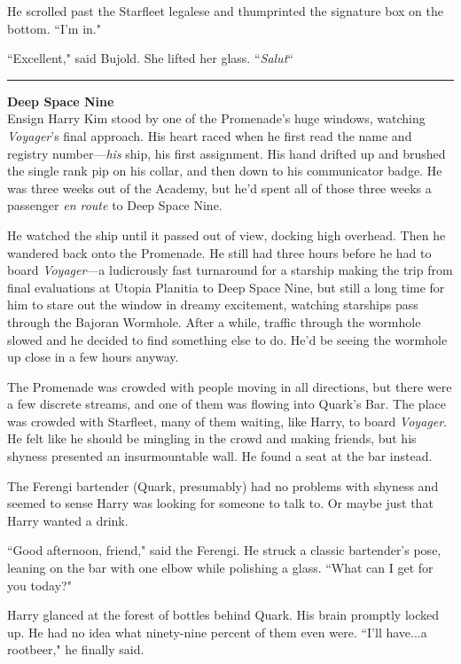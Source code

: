 \documentclass[twoside,letterpaper,12pt]{memoir}
\begin{document}
He scrolled past the Starfleet legalese and thumprinted the signature box on the bottom. ``I'm in."

``Excellent," said Bujold. She lifted her glass. ``\textit{Salut}``

\begin{center}\rule{3cm}{0.4 pt}\end{center}

\noindent\textbf{Deep Space Nine}\\

Ensign Harry Kim stood by one of the Promenade's huge windows, watching \textit{Voyager}'s final approach. His heart raced when he first read the name and registry number---\textit{his} ship, his first assignment. His hand drifted up and brushed the single rank pip on his collar, and then down to his communicator badge. He was three weeks out of the Academy, but he'd spent all of those three weeks a passenger \textit{en route} to Deep Space Nine.

He watched the ship until it passed out of view, docking high overhead. Then he wandered back onto the Promenade. He still had three hours before he had to board \textit{Voyager}---a ludicrously fast turnaround for a starship making the trip from final evaluations at Utopia Planitia to Deep Space Nine, but still a long time for him to stare out the window in dreamy excitement, watching starships pass through the Bajoran Wormhole. After a while, traffic through the wormhole slowed and he decided to find something else to do. He'd be seeing the wormhole up close in a few hours anyway.

The Promenade was crowded with people moving in all directions, but there were a few discrete streams, and one of them was flowing into Quark's Bar. The place was crowded with Starfleet, many of them waiting, like Harry, to board \textit{Voyager}. He felt like he should be mingling in the crowd and making friends, but his shyness presented an insurmountable wall. He found a seat at the bar instead.

The Ferengi bartender (Quark, presumably) had no problems with shyness and seemed to sense Harry was looking for someone to talk to. Or maybe just that Harry wanted a drink.

``Good afternoon, friend," said the Ferengi. He struck a classic bartender's pose, leaning on the bar with one elbow while polishing a glass. ``What can I get for you today?"

Harry glanced at the forest of bottles behind Quark. His brain promptly locked up. He had no idea what ninety-nine percent of them even were. ``I'll have...a rootbeer," he finally said.
\end{document}
